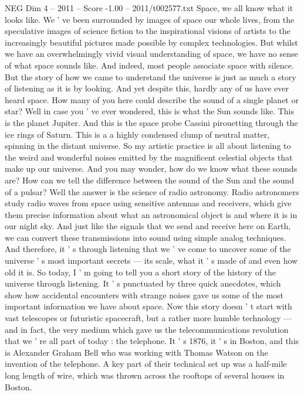 \begin{textsample}{NEG Dim 4 – 2011 – Score -1.00 – 2011/t002577.txt}  \label{ex:f4_neg_010}
Space, we all know what it looks like.
We ' ve been surrounded by images of space our whole lives, from the speculative images of science fiction to the inspirational visions of artists to the increasingly beautiful pictures made possible by complex technologies.
But whilst we have an overwhelmingly vivid visual understanding of space, we have no sense of what space sounds like.
And indeed, most people associate space with silence.
But the story of how we came to understand the universe is just as much a story of listening as it is by looking.
And yet despite this, hardly any of us have ever heard space.
How many of you here could describe the sound of a single planet or star?
Well in case you ' ve ever wondered, this is what the Sun sounds like.
This is the planet Jupiter.
And this is the space probe Cassini pirouetting through the ice rings of Saturn.
This is a a highly condensed clump of neutral matter, spinning in the distant universe.
So my artistic practice is all about listening to the weird and wonderful noises emitted by the magnificent celestial objects that make up our universe.
And you may wonder, how do we know what these sounds are?
How can we tell the difference between the sound of the Sun and the sound of a pulsar?
Well the answer is the science of radio astronomy.
Radio astronomers study radio waves from space using sensitive antennas and receivers, which give them precise information about what an astronomical object is and where it is in our night sky.
And just like the signals that we send and receive here on Earth, we can convert these transmissions into sound using simple analog techniques.
And therefore, it ' s through listening that we ' ve come to uncover some of the universe ' s most important secrets — its scale, what it ' s made of and even how old it is.
So today, I ' m going to tell you a short story of the history of the universe through listening.
It ' s punctuated by three quick anecdotes, which show how accidental encounters with strange noises gave us some of the most important information we have about space.
Now this story doesn ' t start with vast telescopes or futuristic spacecraft, but a rather more humble technology — and in fact, the very medium which gave us the telecommunications revolution that we ' re all part of today : the telephone.
It ' s 1876, it ' s in Boston, and this is Alexander Graham Bell who was working with Thomas Watson on the invention of the telephone.
A key part of their technical set up was a half-mile long length of wire, which was thrown across the rooftops of several houses in Boston.

\end{textsample}
